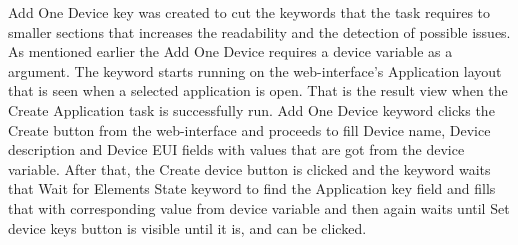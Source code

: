 Add One Device key was created to cut the keywords that the task requires to smaller sections that increases the readability and the detection of possible issues.
As mentioned earlier the Add One Device requires a device variable as a argument.
The keyword starts running on the web-interface's Application layout that is seen when a selected application is open.
That is the result view when the Create Application task is successfully run.
Add One Device keyword  clicks the Create button from the web-interface and proceeds to fill Device name, Device description and Device EUI fields with values that are got from the device variable.
After that, the Create device button is clicked and the keyword waits that Wait for Elements State keyword to find the Application key field and fills that with corresponding value from device variable and then again waits until Set device keys button is visible until it is, and can be clicked.


\cite{chirpstack:getting_started}
\cite{robot_framwework_user_guide:suite_setup_and_teardown}
\clearpage %
